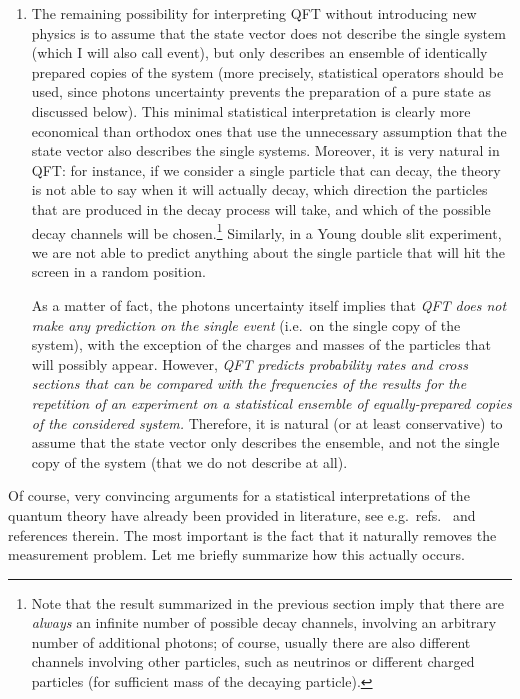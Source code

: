 \documentclass[12pt]{article}
\begin{document}
{\begin{enumerate}
\item The remaining possibility for interpreting QFT without
introducing new physics is to assume that the state vector does
not describe the single system (which I will also call event), but
only describes an ensemble of identically prepared copies of the
system (more precisely, statistical operators should be used,
since photons uncertainty prevents the preparation of a pure state
as discussed below). This minimal statistical interpretation is
clearly more economical than orthodox ones that use the
unnecessary assumption that the state vector also describes the
single systems. Moreover, it is very natural in QFT: for instance,
if we consider a single particle that can decay, the theory is not
able to say when it will actually decay, which direction the
particles that are produced in the decay process will take, and
which of the possible decay channels will be chosen.\footnote{Note
that the result summarized in the previous section imply that
there are \emph{always} an infinite number of possible decay
channels, involving an arbitrary number of additional photons; of
course, usually there are also different channels involving other
particles, such as neutrinos or different charged particles (for
sufficient mass of the decaying particle).} Similarly, in a Young
double slit experiment, we are not able to predict anything about
the single particle that will hit the screen in a random position.

As a matter of fact, the photons uncertainty itself implies that
\emph{QFT does not make any prediction on the single event} (i.e.\ on
the single copy of the system), with the exception of the charges and
masses of the particles that will possibly appear.  However, \emph{QFT
predicts probability rates and cross sections that can be compared
with the frequencies of the results for the repetition of an
experiment on a statistical ensemble of equally-prepared copies of the
considered system.} Therefore, it is natural (or at least
conservative) to assume that the state vector only describes the
ensemble, and not the single copy of the system (that we do not
describe at all).
\end{enumerate}}

Of course, very convincing arguments for a statistical
interpretations of  the quantum theory have already been provided
in literature, see e.g.\ refs.~\cite{Ballentine70,Belinfante,BJ}
and references therein. The most important is the fact that it
naturally removes the measurement problem. Let me briefly
summarize how this actually occurs.
\end{document}
